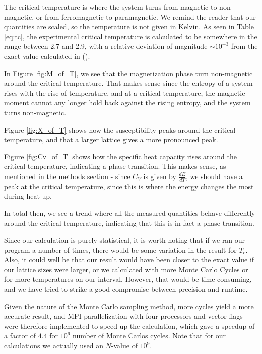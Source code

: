 \documentclass[12pt,english,a4paper]{article}
\begin{document}
The critical temperature is where the system turns from magnetic to non-magnetic, or from ferromagnetic to paramagnetic. We remind the reader that our quantities are scaled, so the temperature is not given in Kelvin. As seen in Table \ref{eq:tc}, the experimental critical temperature is calculated to be somewhere in the range between 2.7 and 2.9, with a relative deviation of magnitude $\sim 10^{-3}$ from the exact value calculated in (\cite{LarsOns}). 

In Figure \ref{fig:M_of_T}, we see that the magnetization phase turn non-magnetic around the critical temperature. That makes sense since the entropy of a system rises with the rise of temperature, and at a critical temperature, the magnetic moment cannot any longer hold back against the rising entropy, and the system turns non-magnetic. 

Figure \ref{fig:X_of_T} shows how the susceptibility peaks around the critical temperature, and that a larger lattice gives a more pronounced peak. 

Figure \ref{fig:Cv_of_T} shows how the specific heat capacity rises around the critical temperature, indicating a phase transition. This makes sense, as mentioned in the methods section - since $C_V$ is given by $\frac{dE}{dT}$, we should have a peak at the critical temperature, since this is where the energy changes the most during heat-up. 

In total then, we see a trend where all the measured quantities behave differently around the critical temperature, indicating that this is in fact a phase transition. 

Since our calculation is purely statistical, it is worth noting that if we ran our program a number of times, there would be some variation in the result for $T_c$. Also, it could well be that our result would have been closer to the exact value if our lattice sizes were larger, or we calculated with more Monte Carlo Cycles or for more temperatures on our interval. However, that would be time consuming, and we have tried to strike a good compromise between precision and runtime. 

Given the nature of the Monte Carlo sampling method, more cycles yield a more accurate result, and MPI parallelization with four processors and vector flags were therefore implemented to speed up the calculation, which gave a speedup of a factor of $4.4$ for $10^{6}$ number of Monte Carlos cycles. Note that for our calculations we actually used an $N$-value of $10^{9}$.
\end{document}
